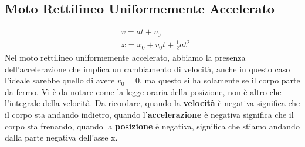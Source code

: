 \documentclass{article}
\numberwithin{equation}{subsection}
\begin{document}
\subsection{Moto Rettilineo Uniformemente Accelerato}
\begin{align}
    & v=at + v_0 \\
    & x=x_0 + v_0t+\frac{1}{2}at^2
\end{align}
Nel moto rettilineo uniformemente accelerato, abbiamo la presenza dell'accelerazione che implica un cambiamento di velocità, anche in questo caso l'ideale sarebbe quello di avere $v_0=0$, ma questo si ha solamente se il corpo parte da fermo. Vi è da notare come la legge oraria della posizione, non è altro che l'integrale della velocità. Da ricordare, quando la \textbf{velocità} è negativa significa che il corpo sta andando indietro, quando l'\textbf{accelerazione} è negativa significa che il corpo sta frenando, quando la \textbf{posizione} è negativa, significa che stiamo andando dalla parte negativa dell'asse x.
\newpage
\end{document}
